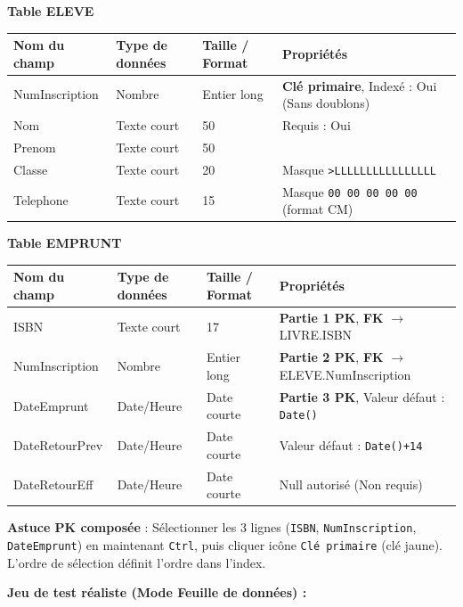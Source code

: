 \documentclass[11pt]{article}
\begin{document}
\begin{exoresolu}
\begin{methode}
\textbf{Table ELEVE}
\begin{center}
\begin{tabularx}{\linewidth}{|l|l|l|X|}\hline
\textbf{Nom du champ} & \textbf{Type de données} & \textbf{Taille / Format} & \textbf{Propriétés} \\ \hline
NumInscription & Nombre & Entier long & \textbf{Clé primaire}, Indexé : Oui (Sans doublons) \\ \hline
Nom & Texte court & 50 & Requis : Oui \\ \hline
Prenom & Texte court & 50 &  \\ \hline
Classe & Texte court & 20 & Masque \texttt{>LLLLLLLLLLLLLLLL} \\ \hline
Telephone & Texte court & 15 & Masque \texttt{00 00 00 00 00} (format CM) \\ \hline
\end{tabularx}
\end{center}

\textbf{Table EMPRUNT}
\begin{center}
\begin{tabularx}{\linewidth}{|l|l|l|X|}\hline
\textbf{Nom du champ} & \textbf{Type de données} & \textbf{Taille / Format} & \textbf{Propriétés} \\ \hline
ISBN & Texte court & 17 & \textbf{Partie 1 PK}, \textbf{FK} $\rightarrow$ LIVRE.ISBN \\ \hline
NumInscription & Nombre & Entier long & \textbf{Partie 2 PK}, \textbf{FK} $\rightarrow$ ELEVE.NumInscription \\ \hline
DateEmprunt & Date/Heure & Date courte & \textbf{Partie 3 PK}, Valeur défaut : \texttt{Date()} \\ \hline
DateRetourPrev & Date/Heure & Date courte & Valeur défaut : \texttt{Date()+14} \\ \hline
DateRetourEff & Date/Heure & Date courte & Null autorisé (Non requis) \\ \hline
\end{tabularx}
\end{center}
\textbf{Astuce PK composée} : Sélectionner les 3 lignes (\texttt{ISBN}, \texttt{NumInscription}, \texttt{DateEmprunt}) en maintenant \texttt{Ctrl}, puis cliquer icône \texttt{Clé primaire} (clé jaune). L'ordre de sélection définit l'ordre dans l'index.
\end{methode}

\textbf{Jeu de test réaliste (Mode Feuille de données) :}


\end{exoresolu}
\end{document}
